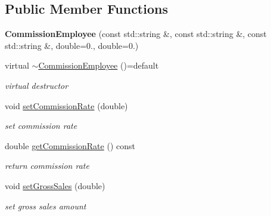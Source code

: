 \subsection*{Public Member Functions}
\begin{DoxyCompactItemize}
\item 
\mbox{\label{class_commission_employee_a46ccb62795b2c82b2ce5d9ca109d21af}} 
{\bfseries Commission\+Employee} (const std\+::string \&, const std\+::string \&, const std\+::string \&, double=0., double=0.)
\item 
\mbox{\label{class_commission_employee_a85d35440afb6065ed90982165bd8a45e}} 
virtual \mbox{\hyperlink{class_commission_employee_a85d35440afb6065ed90982165bd8a45e}{$\sim$\+Commission\+Employee}} ()=default
\begin{DoxyCompactList}\small\item\em virtual destructor \end{DoxyCompactList}\item 
\mbox{\label{class_commission_employee_a9604cfc3151934d2c5616f6961e0abe6}} 
void \mbox{\hyperlink{class_commission_employee_a9604cfc3151934d2c5616f6961e0abe6}{set\+Commission\+Rate}} (double)
\begin{DoxyCompactList}\small\item\em set commission rate \end{DoxyCompactList}\item 
\mbox{\label{class_commission_employee_a494b60111ebada810df48421fe57f875}} 
double \mbox{\hyperlink{class_commission_employee_a494b60111ebada810df48421fe57f875}{get\+Commission\+Rate}} () const
\begin{DoxyCompactList}\small\item\em return commission rate \end{DoxyCompactList}\item 
\mbox{\label{class_commission_employee_a28a54096a9fd1468c39dc03a7f14e543}} 
void \mbox{\hyperlink{class_commission_employee_a28a54096a9fd1468c39dc03a7f14e543}{set\+Gross\+Sales}} (double)
\begin{DoxyCompactList}\small\item\em set gross sales amount \end{DoxyCompactList}\item 

\end{DoxyCompactItemize}
